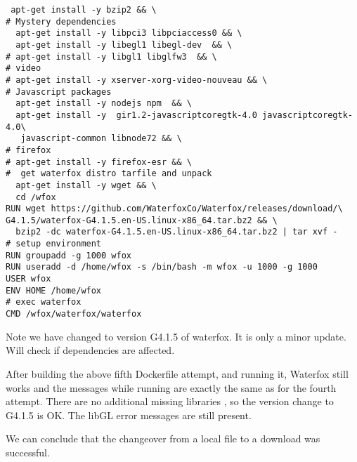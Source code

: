 \documentclass[a4paper]{article}  %
\begin{document}
\begin{tcolorbox}
\begin{verbatim}
 apt-get install -y bzip2 && \
# Mystery dependencies
  apt-get install -y libpci3 libpciaccess0 && \
  apt-get install -y libegl1 libegl-dev  && \
# apt-get install -y libgl1 libglfw3  && \
# video
# apt-get install -y xserver-xorg-video-nouveau && \
# Javascript packages
  apt-get install -y nodejs npm  && \
  apt-get install -y  gir1.2-javascriptcoregtk-4.0 javascriptcoregtk-4.0\
   javascript-common libnode72 && \
# firefox
# apt-get install -y firefox-esr && \
#  get waterfox distro tarfile and unpack
  apt-get install -y wget && \
  cd /wfox 
RUN wget https://github.com/WaterfoxCo/Waterfox/releases/download/\
G4.1.5/waterfox-G4.1.5.en-US.linux-x86_64.tar.bz2 && \
  bzip2 -dc waterfox-G4.1.5.en-US.linux-x86_64.tar.bz2 | tar xvf -
# setup environment
RUN groupadd -g 1000 wfox
RUN useradd -d /home/wfox -s /bin/bash -m wfox -u 1000 -g 1000
USER wfox
ENV HOME /home/wfox
# exec waterfox
CMD /wfox/waterfox/waterfox
\end{verbatim}
\end{tcolorbox}
Note we have changed to version G4.1.5 of waterfox. It is only a minor update. Will check if dependencies are affected.

After building the above fifth Dockerfile attempt, and running it, Waterfox still works and the messages while running are exactly the same as for the fourth attempt. There are no additional missing libraries , so the version change to G4.1.5 is OK. The libGL error messages are still present. 

We can conclude that the changeover from a local file to a download was successful.
\end{document}
